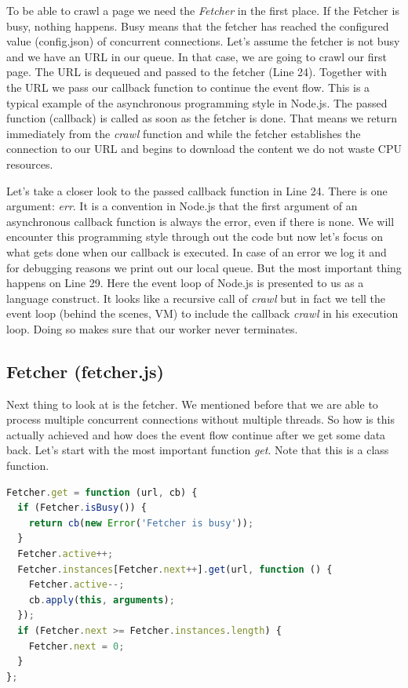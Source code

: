 To be able to crawl a page we need the \emph{Fetcher} in the first place. If the Fetcher is busy, nothing happens. Busy means that the fetcher has reached the configured value (config.json) of concurrent connections.
Let's assume the fetcher is not busy and we have an URL in our queue. In that case, we are going to crawl our first page. The URL is dequeued and passed to the fetcher (Line 24). Together with the URL we pass our callback function to continue the event flow. This is a typical example of the asynchronous programming style in Node.js. The passed function (callback) is called as soon as the fetcher is done. That means we return immediately from the \emph{crawl} function and while the fetcher establishes the connection to our URL and begins to download the content we do not waste CPU resources. 

Let's take a closer look to the passed callback function in Line 24. There is one argument: \emph{err}. It is a convention in Node.js that the first argument of an asynchronous callback function is always the error, even if there is none. We will encounter this programming style through out the code but now let's focus on what gets done when our callback is executed. In case of an error we log it and for debugging reasons we print out our local queue. But the most important thing happens on Line 29. Here the event loop of Node.js is presented to us as a language construct. It looks like a recursive call of \emph{crawl} but in fact we tell the event loop (behind the scenes, VM) to include the callback \emph{crawl} in his execution loop. Doing so makes sure that our worker never terminates.

\subsection{Fetcher (fetcher.js)}
Next thing to look at is the fetcher. We mentioned before that we are able to process multiple concurrent connections without multiple threads. So how is this actually achieved and how does the event flow continue after we get some data back.
Let's start with the most important function \emph{get}. Note that this is a class function.

\begin{lstlisting}[language=JavaScript]
Fetcher.get = function (url, cb) {
  if (Fetcher.isBusy()) {
    return cb(new Error('Fetcher is busy'));
  }
  Fetcher.active++;
  Fetcher.instances[Fetcher.next++].get(url, function () {
    Fetcher.active--;
    cb.apply(this, arguments);
  });
  if (Fetcher.next >= Fetcher.instances.length) {
    Fetcher.next = 0;
  }
};
\end{lstlisting}

